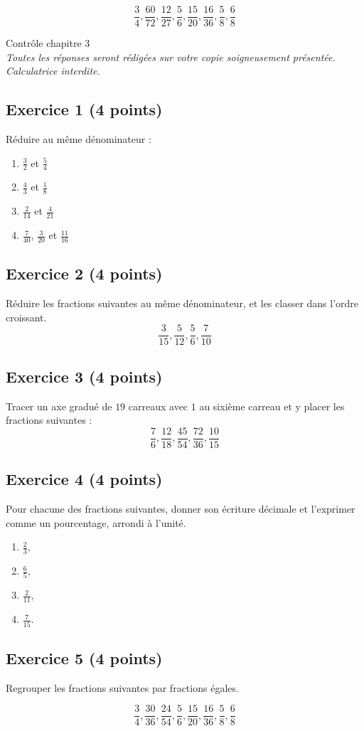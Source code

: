 \documentclass[14 pt]{extarticle}
\theoremstyle{plain}
\begin{document}
\[\frac34 ,  \frac{60}{72},  \frac{12}{27}
,\frac56,
 \frac{15}{20},
 \frac{16}{36},
\frac58, \frac68 
 \]
\newpage


\begin{center}{\Large Contrôle chapitre 3}\\ 
\emph{Toutes les réponses seront rédigées sur votre copie soigneusement présentée. Calculatrice interdite.}
 \end{center}
 \subsection*{Exercice 1 (4 points)}
 Réduire au même dénominateur : 
 
 \begin{enumerate}
 \item $\frac32$ et $\frac54$
 \item $\frac43$ et $\frac18$
 \item $\frac2{14}$ et $\frac4{21}$
 \item $\frac7{40}$, $\frac3{20}$ et $\frac{11}{16}$
 \end{enumerate}

\subsection*{Exercice 2 (4 points)}
Réduire les fractions suivantes au même dénominateur, et les classer dans l'ordre croissant. 
\[ \frac3{15}, \frac5{12}, \frac56, \frac7{10}\]
\subsection*{Exercice 3 (4 points)}

Tracer un axe gradué de $19$ carreaux avec $1$ au sixième carreau et y placer les fractions suivantes : 
\[ \frac76, \frac{12}{18}, \frac{45}{54}, \frac{72}{36}, \frac{10}{15}\]

\subsection*{Exercice 4 (4 points)}

Pour chacune des fractions suivantes, donner son écriture décimale et l'exprimer comme un pourcentage, arrondi à l'unité. 
\begin{enumerate}
\item $\frac23$,
\item $\frac65$,
\item $\frac2{11}$,
\item $\frac{7}{15}$. 
\end{enumerate}

\subsection*{Exercice 5 (4 points)}
Regrouper les fractions suivantes par fractions égales. 

\[\frac34 ,  \frac{30}{36},  \frac{24}{54}
,\frac56,
 \frac{15}{20},
 \frac{16}{36},
\frac58, \frac68 
 \]
 	
\end{document}
